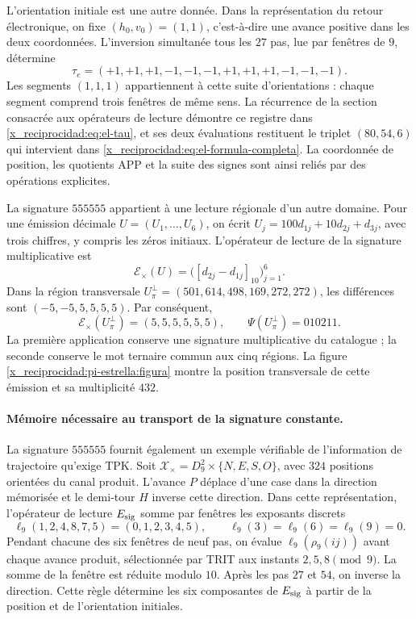 L'orientation initiale est une autre donnée. Dans la représentation du
retour électronique, on fixe \((h_0,v_0)=(1,1)\), c'est-à-dire une avance
positive dans les deux coordonnées. L'inversion simultanée tous les \(27\)
pas, lue par fenêtres de \(9\), détermine
\[
 \tau_e=(+1,+1,+1,-1,-1,-1,+1,+1,+1,-1,-1,-1).
\]
Les segments \((1,1,1)\) appartiennent à cette suite d'orientations :
chaque segment comprend trois fenêtres de même sens. La récurrence
de la section consacrée aux opérateurs de lecture démontre ce registre dans
\eqref{x_reciprocidad:eq:el-tau}, et ses deux évaluations restituent le triplet
\((80,54,6)\) qui intervient dans
\eqref{x_reciprocidad:eq:el-formula-completa}. La coordonnée de position, les
quotients APP et la suite des signes sont ainsi reliés par
des opérations explicites.

La signature \(555555\) appartient à une lecture régionale d'un autre
domaine. Pour une émission décimale \(U=(U_1,\ldots,U_6)\), on écrit
\(U_j=100d_{1j}+10d_{2j}+d_{3j}\), avec trois chiffres, y compris les
zéros initiaux. L'opérateur de lecture de la signature multiplicative est
\[
 \mathcal E_\times(U)
   =\bigl([d_{2j}-d_{1j}]_{10}\bigr)_{j=1}^{6}.
\]
Dans la région transversale
\(U_\pi^\perp=(501,614,498,169,272,272)\), les différences sont
\((-5,-5,5,5,5,5)\). Par conséquent,
\begin{equation}
 \mathcal E_\times(U_\pi^\perp)=(5,5,5,5,5,5),\qquad
 \Psi(U_\pi^\perp)=010211.
 \label{x_reciprocidad:el-centro:firma-transversal}
\end{equation}
La première application conserve une signature multiplicative du catalogue ;
la seconde conserve le mot ternaire commun aux cinq régions.
La figure \ref{x_reciprocidad:pi-estrella:figura} montre la position transversale de
cette émission et sa multiplicité \(432\).

\paragraph{Mémoire nécessaire au transport de la signature constante.}
La signature \(555555\) fournit également un exemple vérifiable de
l'information de trajectoire qu'exige TPK. Soit
\(\mathcal X_\times=D_9^2\times\{N,E,S,O\}\), avec \(324\)
positions orientées du canal produit. L'avance \(P\) déplace
d'une case dans la direction mémorisée et le demi-tour \(H\)
inverse cette direction. Dans cette représentation, l'opérateur de lecture
\(E_{\rm sig}\) somme par fenêtres les exposants discrets
\[
 \ell_9(1,2,4,8,7,5)=(0,1,2,3,4,5),\qquad
 \ell_9(3)=\ell_9(6)=\ell_9(9)=0.
\]
Pendant chacune des six fenêtres de neuf pas, on évalue
\(\ell_9(\rho_9(ij))\) avant chaque avance produit, sélectionnée
par TRIT aux instants \(2,5,8\pmod9\). La somme de la fenêtre est
réduite modulo \(10\). Après les pas \(27\) et \(54\), on inverse
la direction. Cette règle détermine les six composantes de
\(E_{\rm sig}\) à partir de la position et de l'orientation initiales.

